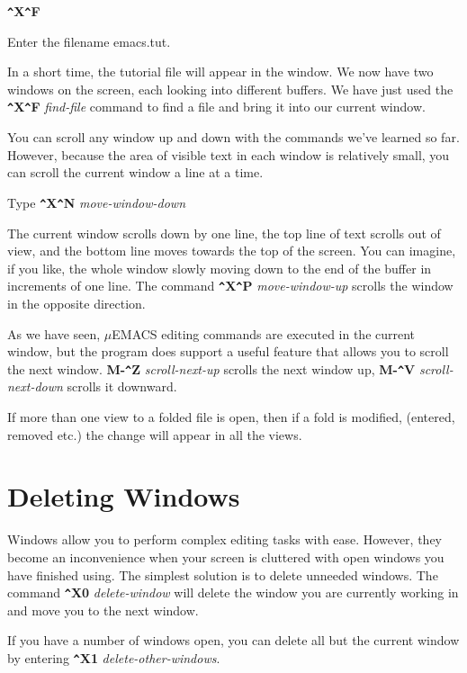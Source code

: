 {\bf \verb+^+X\verb+^+F}

Enter the filename emacs.tut.

In a short time, the tutorial file will appear in the window. We now
have two windows on the screen, each looking into different buffers. We
have just used the {\bf \verb+^+X\verb+^+F} {\it find-file} command to
find a file and bring it into our current window.

You can scroll any window up and down with the commands we've learned
so far. However, because the area of visible text in each window is
relatively small, you can scroll the current window a line at a time.

Type {\bf \verb+^+X\verb+^+N} {\it move-window-down}

The current window scrolls down by one line, the top line of text
scrolls out of view, and the bottom line moves towards the top of the
screen. You can imagine, if you like, the whole window slowly moving
down to the end of the buffer in increments of one line. The command
{\bf \verb+^+X\verb+^+P} {\it move-window-up} scrolls the window in
the opposite direction.

As we have seen, $\mu$EMACS editing commands are executed in the
current window, but the program does support a useful feature that
allows you to scroll the next window. {\bf M-\verb+^+Z} {\it
scroll-next-up} scrolls the next window up, {\bf M-\verb+^+V} {\it
scroll-next-down} scrolls it downward. 

If more than one view to a folded file is open, then if a fold is
modified, (entered, removed etc.) the change will appear in all the
views.
\section{Deleting Windows}

Windows allow you to perform complex editing tasks with ease. However,
they become an inconvenience when your screen is cluttered with open
windows you have finished using. The simplest solution is to delete
unneeded windows. The command {\bf \verb+^+X0} {\it delete-window} will
delete the window you are currently working in and move you to the next
window.

If you have a number of windows open, you can delete all but the
current window by entering {\bf \verb+^+X1} {\it delete-other-windows}.

